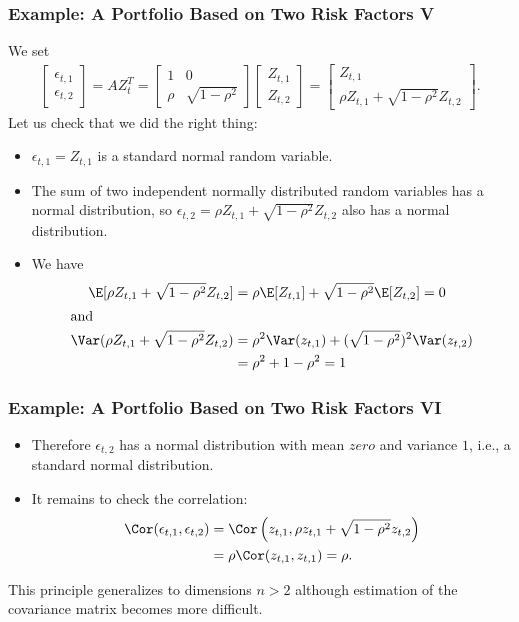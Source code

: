 \begin{frame}[fragile]
\frametitle{Example: A Portfolio Based on Two Risk Factors V}
We set
\begin{align*}
  \left[\begin{array}{c} \epsilon_{t,1}\\
  	\epsilon_{t,2} \end{array}\right] = A Z_t^T =
  	\left[\begin{array}{cc} 1& 0 \\
  	\rho &\sqrt{1-\rho^2} \end{array}\right]\left[\begin{array}{c} Z_{t,1} \\
  	Z_{t,2} \end{array}\right] = \left[\begin{array}{c} Z_{t,1}\\
  	\rho Z_{t,1} +\sqrt{1-\rho^2}Z_{t,2} \end{array}\right].
\end{align*}
Let us check that we did the right thing:
\begin{itemize}
  \item $\epsilon_{t,1}=Z_{t,1}$ is a standard normal random variable.
  \item The sum of two independent normally distributed random variables has a
  normal distribution, so $\epsilon_{t,2}=\rho Z_{t,1} +\sqrt{1-\rho^2}Z_{t,2}$
  also has a normal distribution.
  \item We have
  \abovedisplayskip=2pt
  	\begin{align*}
  		\E[\rho Z_{t,1} +\sqrt{1-\rho^2}Z_{t,2}] &= \rho\E[Z_{t,1}] +
  		\sqrt{1-\rho^2}\E[Z_{t,2}] = 0\\
  	\intertext{and}
  	\Var(\rho Z_{t,1} +\sqrt{1-\rho^2}Z_{t,2}) &= \rho^2\Var(z_{t,1}) + (\sqrt{1-\rho^2})^2
  \Var(z_{t,2})\\
   &= \rho^2 + 1 -\rho^2 =1
	\end{align*}
\end{itemize}
\end{frame}

\begin{frame}[fragile]
\frametitle{Example: A Portfolio Based on Two Risk Factors VI}
\begin{itemize}
  \item Therefore $\epsilon_{t,2}$ has a normal distribution with mean $zero$ and
	variance $1$, i.e., a standard normal distribution.
  \item It remains to check the correlation:
	\begin{align*}
	  \Cor(\epsilon_{t,1},\epsilon_{t,2}) &= \Cor\left(z_{t,1},\rho z_{t,1} +
	  \sqrt{1-\rho^2}z_{t,2}\right)\\
	   &= \rho \Cor(z_{t,1},z_{t,1}) =\rho.
	\end{align*}
\end{itemize}
This principle generalizes to dimensions $n>2$ although estimation of the
covariance matrix becomes more difficult.
\end{frame}

